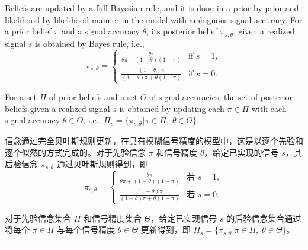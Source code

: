 \documentclass[12pt,a4paper]{article}
\newenvironment{original}{%
  \par\vspace{4pt}\noindent%
  \color{black}%
  \ignorespaces
}{%
  \par\vspace{2pt}%
}
\newenvironment{translation}{%
  \par\vspace{2pt}\noindent%
  \color{transblue}%
  \ignorespaces
}{%
  \par\vspace{4pt}\hrule\vspace{6pt}%
}
\begin{document}
\begin{original}
Beliefs are updated by a full Bayesian rule, and it is done in a prior-by-prior and likelihood-by-likelihood manner in the model with ambiguous signal accuracy. For a prior belief $\pi$ and a signal accuracy $\theta$, its posterior belief $\pi_{s, \theta}$, given a realized signal $s$ is obtained by Bayes rule, i.e.,
\[
\pi_{s, \theta} = \begin{cases}
\frac{\theta\pi}{\theta\pi + (1-\theta)(1-\pi)} & \text{if } s = 1,\\[4pt]
\frac{(1-\theta)\pi}{(1-\theta)\pi + \theta(1-\pi)} & \text{if } s = 0.
\end{cases}
\]

For a set $\Pi$ of prior beliefs and a set $\Theta$ of signal accuracies, the set of posterior beliefs given a realized signal $s$ is obtained by updating each $\pi \in \Pi$ with each signal accuracy $\theta \in \Theta$, i.e., $\Pi_s = \big\{ \pi_{s,\theta} \big| \pi \in \Pi, \; \theta \in \Theta \big\}$.
\end{original}
\begin{translation}
信念通过完全贝叶斯规则更新，在具有模糊信号精度的模型中，这是以逐个先验和逐个似然的方式完成的。对于先验信念 $\pi$ 和信号精度 $\theta$，给定已实现的信号 $s$，其后验信念 $\pi_{s, \theta}$ 通过贝叶斯规则得到，即
\[
\pi_{s, \theta} = \begin{cases}
\frac{\theta\pi}{\theta\pi + (1-\theta)(1-\pi)} & \text{若 } s = 1,\\[4pt]
\frac{(1-\theta)\pi}{(1-\theta)\pi + \theta(1-\pi)} & \text{若 } s = 0.
\end{cases}
\]

对于先验信念集合 $\Pi$ 和信号精度集合 $\Theta$，给定已实现信号 $s$ 的后验信念集合通过将每个 $\pi \in \Pi$ 与每个信号精度 $\theta \in \Theta$ 更新得到，即 $\Pi_s = \big\{ \pi_{s,\theta} \big| \pi \in \Pi, \; \theta \in \Theta \big\}$。
\end{translation}
\end{document}
